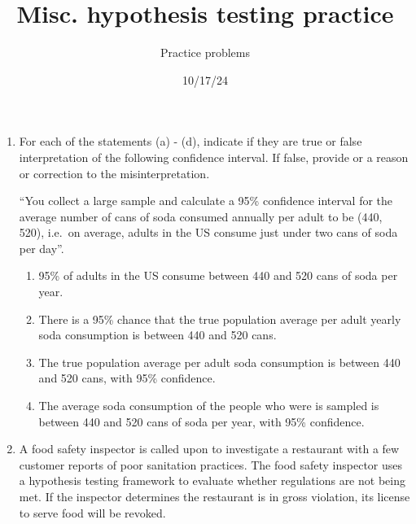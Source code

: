 \documentclass[
  letterpaper,
  DIV=11,
  numbers=noendperiod]{scrartcl}
\title{Misc. hypothesis testing practice}
\author{Practice problems}
\date{10/17/24}
\providecommand{\tightlist}{%
  \setlength{\itemsep}{0pt}\setlength{\parskip}{0pt}}\usepackage{longtable,booktabs,array}
\begin{document}
\maketitle
\ifdefined\Shaded\renewenvironment{Shaded}{\begin{tcolorbox}[borderline west={3pt}{0pt}{shadecolor}, breakable, frame hidden, enhanced, interior hidden, sharp corners, boxrule=0pt]}{\end{tcolorbox}}\fi

\begin{enumerate}
\def\labelenumi{\arabic{enumi}.}
\item
  For each of the statements (a) - (d), indicate if they are true or
  false interpretation of the following confidence interval. If false,
  provide or a reason or correction to the misinterpretation.

  ``You collect a large sample and calculate a 95\% confidence interval
  for the average number of cans of soda consumed annually per adult to
  be (440, 520), i.e.~on average, adults in the US consume just under
  two cans of soda per day''.

  \begin{enumerate}
  \def\labelenumii{\alph{enumii}.}
  \tightlist
  \item
    95\% of adults in the US consume between 440 and 520 cans of soda
    per year.
  \item
    There is a 95\% chance that the true population average per adult
    yearly soda consumption is between 440 and 520 cans.
  \item
    The true population average per adult soda consumption is between
    440 and 520 cans, with 95\% confidence.
  \item
    The average soda consumption of the people who were is sampled is
    between 440 and 520 cans of soda per year, with 95\% confidence.
  \end{enumerate}
\item
  A food safety inspector is called upon to investigate a restaurant
  with a few customer reports of poor sanitation practices. The food
  safety inspector uses a hypothesis testing framework to evaluate
  whether regulations are not being met. If the inspector determines the
  restaurant is in gross violation, its license to serve food will be
  revoked.


\end{enumerate}
\end{document}
